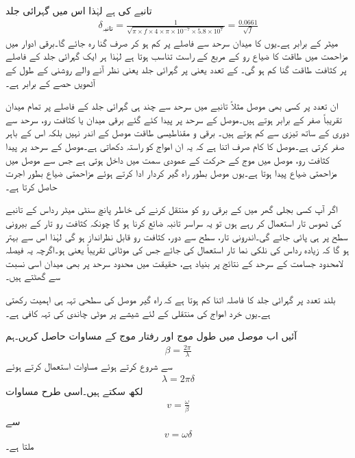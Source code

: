 تانبے کی  ہے لہٰذا اس میں گہرائی جلد
\begin{align*}
\delta_{\text{تانبہ}}=\frac{1}{\sqrt{\pi \times f  \times 4 \times \pi \times 10^{-7} \times 5.8 \times 10^{7}}}=\frac{0.0661}{\sqrt{f}}
\end{align*}
میٹر کے برابر ہے۔یوں  کا میدان سرحد سے  فاصلے پر کم ہو کر صرف  گنا رہ جائے گا۔برقی ادوار میں مزاحمت میں طاقت کا ضیاع رو کے مربع کے راست تناسب ہوتا ہے لہٰذا ہر ایک گہرائی جلد کے فاصلے پر کثافت طاقت  گنا کم ہو گی۔ کے تعدد یعنی  پر گہرائی جلد  یعنی نظر آنے والے روشنی کے طول کے آٹھویں حصے  کے برابر ہے۔

ان تعدد پر کسی بھی موصل مثلاً تانبے میں سرحد سے چند ہی گہرائی جلد کے فاصلے پر تمام میدان تقریباً صفر کے برابر ہوتے ہیں۔موصل کے سرحد پر پیدا کئے گئے برقی میدان یا کثافت رو، سرحد سے دوری کے ساتھ تیزی سے کم ہوتے ہیں۔ برقی و مقناطیسی طاقت موصل کے اندر نہیں بلکہ اس کے باہر صفر کرتی ہے۔موصل کا کام صرف اتنا ہے کہ یہ ان امواج کو راستہ دکھاتی ہے۔موصل کے سرحد پر پیدا کثافت رو، موصل میں موج کے حرکت کے عمودی سمت میں داخل ہوتی ہے جس سے موصل میں مزاحمتی ضیاع پیدا ہوتا ہے۔یوں موصل بطور راہ گیر  کردار ادا کرتے ہوئے مزاحمتی ضیاع بطور اجرت حاصل کرتا ہے۔  

اگر آپ کسی بجلی گھر میں   کے برقی رو کو منتقل کرنے کی خاطر پانچ سنٹی میٹر رداس کے تانبے کی ٹھوس تار استعمال کر رہے ہوں تو یہ سراسر تانبہ ضائع کرنا ہو گا چونکہ کثافت رو تار کے بیرونی سطح پر ہی پائی جائے گی۔اندرونی تار، سطح سے دور، کثافت رو قابل نظرانداز ہو گی لہٰذا اس سے بہتر ہو گا کہ زیادہ رداس کی نلکی نما تار استعمال کی جائے جس کی موٹائی تقریباً  یعنی  ہو۔اگرچہ یہ فیصلہ لامحدود جسامت کے سرحد کے نتائج پر بنیاد ہے، حقیقت میں محدود سرحد پر بھی میدان اسی نسبت سے گھٹتے ہیں۔

بلند تعدد پر گہرائی جلد کا فاصلہ اتنا کم ہوتا ہے کہ راہ گیر موصل کی سطحی تہہ ہی اہمیت رکھتی ہے۔یوں خرد امواج کی منتقلی کے لئے شیشے پر  موٹی چاندی کی تہہ کافی ہے۔

آئیں اب موصل میں طول موج اور رفتار موج کے مساوات حاصل کریں۔ہم
\begin{align*}
\beta=\frac{2\pi}{\lambda}
\end{align*}
سے شروع کرتے ہوئے مساوات  استعمال کرتے ہوئے
\begin{align*}
\lambda=2\pi\delta
\end{align*}
لکھ سکتے ہیں۔اسی طرح مساوات 
\begin{align*}
v=\frac{\omega}{\beta}
\end{align*}
سے
\begin{align}
v=\omega \delta
\end{align}
ملتا ہے۔

